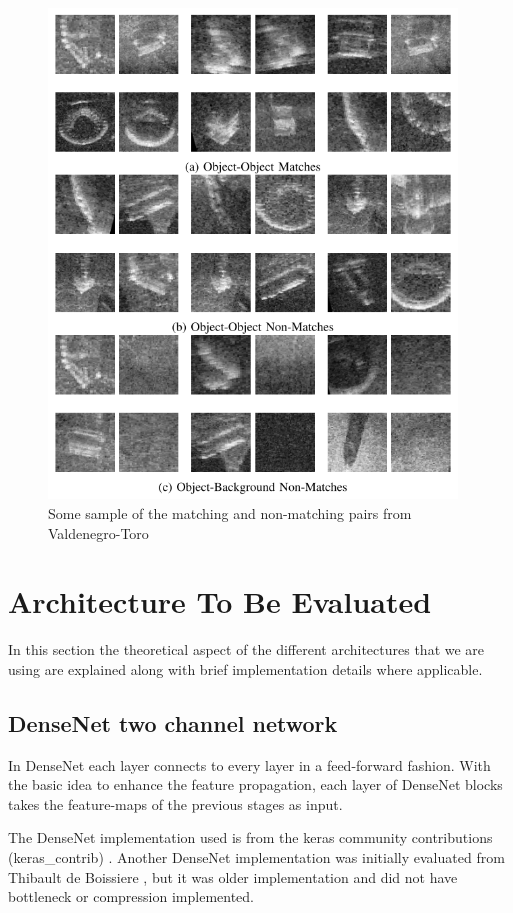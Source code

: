 \begin{figure}[ht]
\centering
\includegraphics[height= 13cm]{images/densenet/generated_patches}
\caption{Some sample of the matching and non-matching pairs from Valdenegro-Toro \cite{stateoftheart}}
\label{fig:generated_patches}
\end{figure}

\flushbottom
\newpage
\section{Architecture To Be Evaluated}
\label{architectures}

In this section the theoretical aspect of the different architectures that we are using are explained along with brief implementation details where applicable. %
\subsection{DenseNet two channel network}
In DenseNet each layer connects to every layer in a feed-forward fashion. 
With the basic idea to enhance the feature propagation, each layer of DenseNet blocks takes the feature-maps of the previous stages as input.  

The DenseNet implementation used is from the keras community contributions (keras\_contrib)  \cite{kerasdensenet}. Another DenseNet implementation was initially evaluated from Thibault de Boissiere \cite{densenetold}, but it was older 
implementation and did not have bottleneck or compression implemented. 

